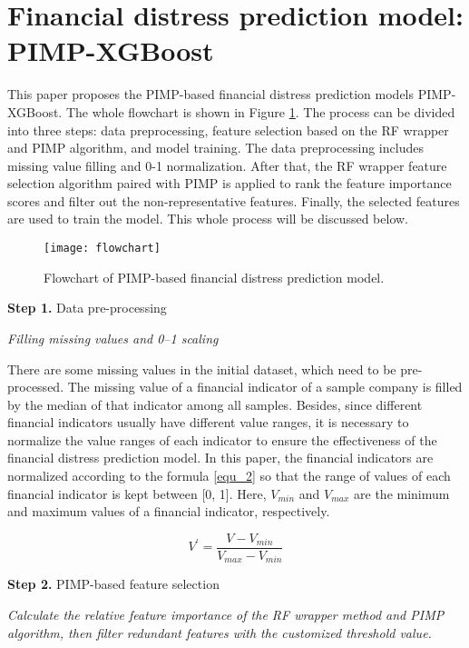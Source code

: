\documentclass[review]{elsarticle}
\begin{document}
\section{Financial distress prediction model: PIMP-XGBoost}
\label{section_3}
This paper proposes the PIMP-based financial distress prediction models PIMP-XGBoost. The whole flowchart is shown in Figure \ref{fig: flowchart}. The process can be divided into three steps: data preprocessing, feature selection based on the RF wrapper and PIMP algorithm, and model training. The data preprocessing includes missing value filling and 0-1 normalization. After that, the RF wrapper feature selection algorithm paired with PIMP is applied to rank the feature importance scores and filter out the non-representative features. Finally, the selected features are used to train the model. This whole process will be discussed below.

\begin{figure}[H]
    \centering
    \texttt{[image: flowchart]}
    \caption{Flowchart of PIMP-based financial distress prediction model.}
    \label{fig: flowchart}
\end{figure}

\textbf{Step 1.} Data pre-processing

\textit{Filling missing values and 0–1 scaling}

There are some missing values in the initial dataset, which need to be pre-processed. The missing value of a financial indicator of a sample company is filled by the median of that indicator among all samples. Besides, since different financial indicators usually have different value ranges, it is necessary to normalize the value ranges of each indicator to ensure the effectiveness of the financial distress prediction model. In this paper, the financial indicators are normalized according to the formula \ref{equ_2} so that the range of values of each financial indicator is kept between [0, 1]. Here, $V_{min}$ and $V_{max}$ are the minimum and maximum values of a financial indicator, respectively.

\begin{equation} \label{equ_2}
    V^{'}=\frac{V-V_{min}}{V_{max}-V_{min}}
\end{equation}

\textbf{Step 2.} PIMP-based feature selection

\textit{Calculate the relative feature importance of the RF wrapper method and PIMP algorithm, then filter redundant features with the customized threshold value.}
\end{document}
